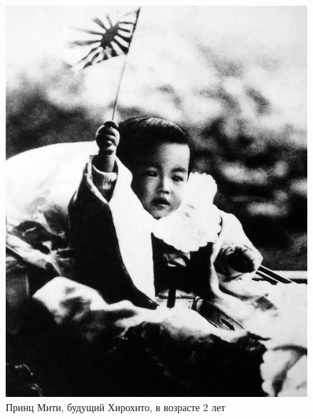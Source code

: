 \begin{figure}[h!tb] 
	\centering\includegraphics[scale=0.5]{Glava2/twkoleSHWaI.jpg}
	\caption{Принц Мити, будущий Хирохито, в возрасте 2 лет}%
\end{figure}

